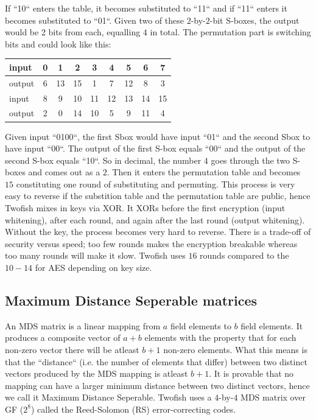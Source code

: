 If ``10`` enters the table, it becomes substituted to ``11`` and if ``11`` enters it becomes substituted to ``01``.
Given two of these $2$-by-$2$-bit S-boxes, the output would be 2 bits from each, equalling $4$ in total.
The permutation part is switching bits and could look like this:
\begin{table}[htp]
  \begin{center}
    \label{fig:small_permu_example}
    \begin{tabular}{|l|c|c|c|c|c|c|c|c|}
      \hline
      input  & 0  & 1  & 2  & 3  & 4  & 5  & 6  & 7  \\ \hline
      output & 6  & 13 & 15 & 1  & 7  & 12 & 8  & 3  \\ \hline
      input  & 8  & 9  & 10 & 11 & 12 & 13 & 14 & 15 \\ \hline
      output & 2  & 0  & 14 & 10 & 5  & 9  & 11 & 4  \\ \hline
    \end{tabular}
  \end{center}
\end{table}

Given input ``0100``, the first Sbox would have input ``01`` and the second Sbox to have input ``00``.
The output of the first S-box equals ``00`` and the output of the second S-box equals ``10``.
So in decimal, the number $4$ goes through the two S-boxes and comes out as a $2$.
Then it enters the permutation table and becomes $15$ constituting one round of substituting and permuting.
This process is very easy to reverse if the substition table and the permutation table are public, hence Twofish mixes in keys via XOR.
It XORs before the first encryption (input whitening), after each round, and again after the last round (output whitening).
Without the key, the process becomes very hard to reverse.
There is a trade-off of security versus speed; too few rounds makes the encryption breakable whereas too many rounds will make it slow.
Twofish uses $16$ rounds compared to the $10-14$ for AES depending on key size.

\subsection{Maximum Distance Seperable matrices}
An MDS matrix is a linear mapping from $a$ field elements to $b$ field elements. It produces a composite vector of $a + b$ elements with the property that for each non-zero vector there will be atleast $b + 1$ non-zero elements.
What this means is that the ``distance`` (i.e. the number of elements that differ) between two distinct vectors produced by the MDS mapping is atleast $b + 1$.
It is provable that no mapping can have a larger minimum distance between two distinct vectors\cite{TwofishPaper}, hence we call it Maximum Distance Seperable.
Twofish uses a $4$-by-$4$ MDS matrix over GF ($2^8$) called the Reed-Solomon (RS) error-correcting codes.

